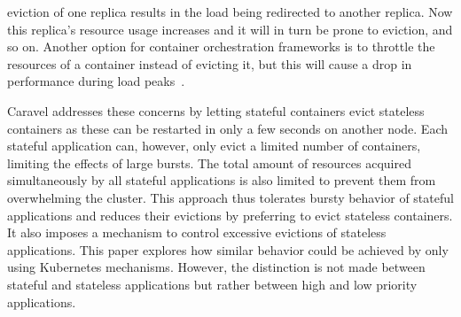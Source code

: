 eviction of one replica results in the load being redirected to another replica. Now this replica's resource usage increases and it will in turn be prone to eviction, and so on. Another option for container orchestration frameworks is to throttle the resources of a container instead of evicting it, but this will cause a drop in performance during load peaks~\citep{caravel}.

Caravel addresses these concerns by letting stateful containers evict stateless containers as these can be restarted in only a few seconds on another node. Each stateful application can, however, only evict a limited number of containers, limiting the effects of large bursts. The total amount of resources acquired simultaneously by all stateful applications is also limited to prevent them from overwhelming the cluster. 
This approach thus tolerates bursty behavior of stateful applications and reduces their evictions by preferring to evict stateless containers. It also imposes a mechanism to control excessive evictions of stateless applications. This paper explores how similar behavior could be achieved by only using Kubernetes mechanisms. However, the distinction is not made between stateful and stateless applications but rather between high and low priority applications. 

